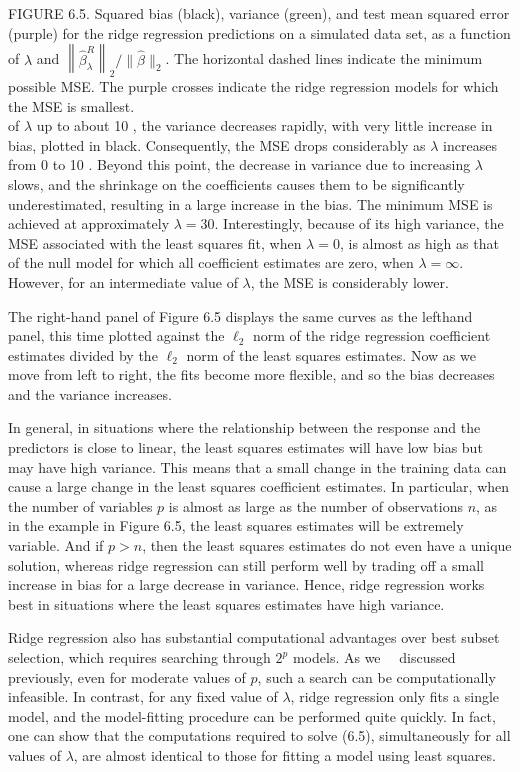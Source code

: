\documentclass[10pt]{article}
\begin{document}
FIGURE 6.5. Squared bias (black), variance (green), and test mean squared error (purple) for the ridge regression predictions on a simulated data set, as a function of $\lambda$ and $\left\|\hat{\beta}_{\lambda}^{R}\right\|_{2} /\|\hat{\beta}\|_{2}$. The horizontal dashed lines indicate the minimum possible MSE. The purple crosses indicate the ridge regression models for which the MSE is smallest.\\
of $\lambda$ up to about 10 , the variance decreases rapidly, with very little increase in bias, plotted in black. Consequently, the MSE drops considerably as $\lambda$ increases from 0 to 10 . Beyond this point, the decrease in variance due to increasing $\lambda$ slows, and the shrinkage on the coefficients causes them to be significantly underestimated, resulting in a large increase in the bias. The minimum MSE is achieved at approximately $\lambda=30$. Interestingly, because of its high variance, the MSE associated with the least squares fit, when $\lambda=0$, is almost as high as that of the null model for which all coefficient estimates are zero, when $\lambda=\infty$. However, for an intermediate value of $\lambda$, the MSE is considerably lower.

The right-hand panel of Figure 6.5 displays the same curves as the lefthand panel, this time plotted against the $\ell_{2}$ norm of the ridge regression coefficient estimates divided by the $\ell_{2}$ norm of the least squares estimates. Now as we move from left to right, the fits become more flexible, and so the bias decreases and the variance increases.

In general, in situations where the relationship between the response and the predictors is close to linear, the least squares estimates will have low bias but may have high variance. This means that a small change in the training data can cause a large change in the least squares coefficient estimates. In particular, when the number of variables $p$ is almost as large as the number of observations $n$, as in the example in Figure 6.5, the least squares estimates will be extremely variable. And if $p>n$, then the least squares estimates do not even have a unique solution, whereas ridge regression can still perform well by trading off a small increase in bias for a large decrease in variance. Hence, ridge regression works best in situations where the least squares estimates have high variance.

Ridge regression also has substantial computational advantages over best subset selection, which requires searching through $2^{p}$ models. As we\
\
discussed previously, even for moderate values of $p$, such a search can be computationally infeasible. In contrast, for any fixed value of $\lambda$, ridge regression only fits a single model, and the model-fitting procedure can be performed quite quickly. In fact, one can show that the computations required to solve (6.5), simultaneously for all values of $\lambda$, are almost identical to those for fitting a model using least squares.
\end{document}
